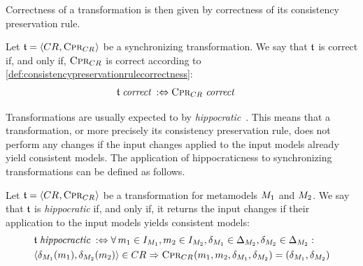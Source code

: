 Correctness of a transformation is then given by correctness of its consistency preservation rule.

\begin{definition}
    \label{def:synchronizingtransformationcorrectness}
    Let $\mathfrak{t} = \langle CR_{}, \textsc{Cpr}_{CR_{}} \rangle$ be a synchronizing transformation.
    We say that $\mathfrak{t}$ is correct if, and only if, $\textsc{Cpr}_{CR_{}}$ is correct according to \autoref{def:consistencypreservationrulecorrectness}:
    \begin{align*}
        &
        \mathfrak{t} \; \textit{correct} \; :\Leftrightarrow \textsc{Cpr}_{CR_{}} \; \textit{correct} \;
    \end{align*}
\end{definition}

Transformations are usually expected to by \emph{hippocratic}~\cite{stevens2010sosym}.
This means that a transformation, or more precisely its consistency preservation rule, does not perform any changes if the input changes applied to the input models already yield consistent models.
The application of hippocraticness to synchronizing transformations can be defined as follows.
\begin{definition}
    \label{def:hippocratictransformation}
    Let $\mathfrak{t} = \langle CR_{}, \textsc{Cpr}_{CR_{}} \rangle$ be a transformation for metamodels $M_{1}$ and $M_{2}$.
    We say that $\mathfrak{t}$ is \emph{hippocratic} if, and only if, it returns the input changes if their application to the input models yields consistent models:
    \begin{align*}
        &
        \transformation{t} \mathtextspacearound{hippocractic} \equivalentperdefinition
        \forall
        \model{m}{1} \in \metamodelinstanceset{M}{1}, \model{m}{2} \in \metamodelinstanceset{M}{2}, 
        \change{\metamodel{M}{1}} \in \changeuniverse{\metamodel{M}{2}}, \change{\metamodel{M}{2}} \in \changeuniverse{\metamodel{M}{2}} : \\
        &
        \tupled{\change{\metamodel{M}{1}}(\model{m}{1}), \change{\metamodel{M}{2}}(\model{m}{2})} \in \consistencyrelation{CR}{} \Rightarrow \consistencypreservationrule{\consistencyrelation{CR}{}}(\model{m}{1}, \model{m}{2}, \change{\metamodel{M}{1}}, \change{\metamodel{M}{2}}) = (\change{\metamodel{M}{1}}, \change{\metamodel{M}{2}})
    \end{align*}
\end{definition}

